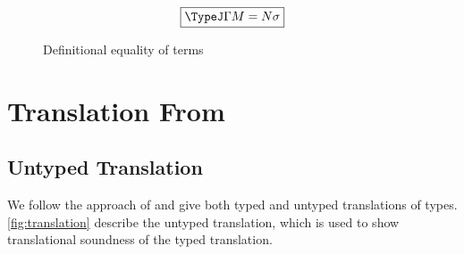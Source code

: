 \documentclass[authoryear,acmsmall,screen]{acmart}
\begin{document}
\begin{figure}[H]
\small
\begin{gather*}
\fbox{$\TypeJ \Gamma {M = N}{\sigma}$} \\
\end{gather*}
\caption{Definitional equality of \IX{} terms}
\label{fig:IxDefnEq}
\end{figure}




\section{Translation From \RO}

\subsection{Untyped Translation}

We follow the approach of \cite{MorrisM19} and give both typed and untyped translations of \RO types. \cref{fig:translation} describe the untyped translation, which is used to show translational soundness of the typed translation.
\end{document}
